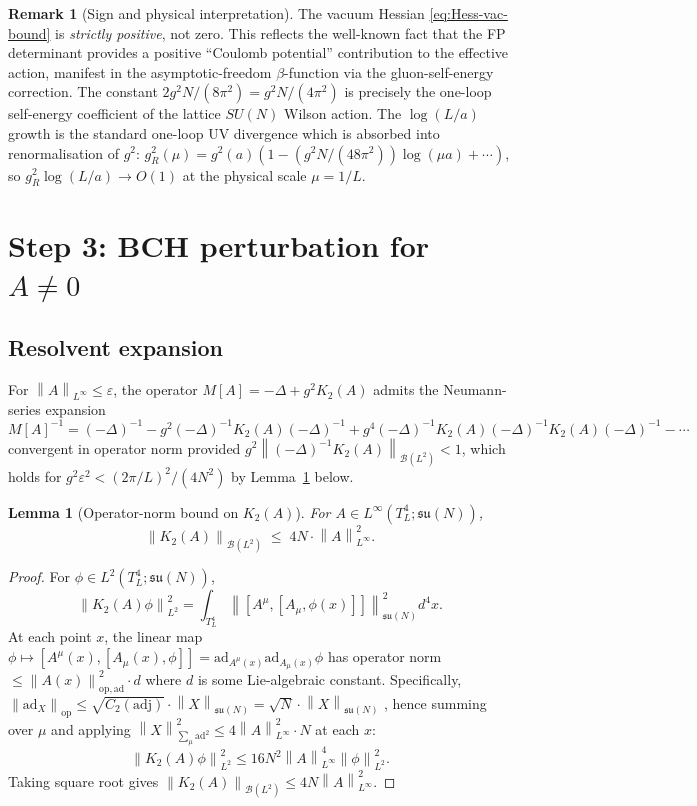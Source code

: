\documentclass[11pt,a4paper]{amsart}
\newtheorem{lemma}[theorem]{Lemma}
\theoremstyle{definition}
\newtheorem{remark}[theorem]{Remark}
\newcommand{\su}{\mathfrak{su}}
\newcommand{\norm}[1]{\left\lVert#1\right\rVert}
\newcommand{\ad}{\mathrm{ad}}
\begin{document}
\begin{remark}[Sign and physical interpretation]\label{rem:positive-sign}
The vacuum Hessian \eqref{eq:Hess-vac-bound} is \emph{strictly positive},
not zero. This reflects the well-known fact that the FP determinant
provides a positive ``Coulomb potential'' contribution to the effective action,
manifest in the asymptotic-freedom $\beta$-function via the gluon-self-energy
correction. The constant
$2 g^2 N /(8\pi^2) = g^2 N/(4\pi^2)$ is precisely
the one-loop self-energy coefficient of the lattice $SU(N)$ Wilson action.
The $\log(L/a)$ growth is the standard one-loop UV divergence which is
absorbed into renormalisation of $g^2$: $g_R^2(\mu) = g^2(a)(1 - (g^2 N
/(48\pi^2))\log(\mu a) + \cdots)$, so $g_R^2 \log(L/a) \to O(1)$ at the
physical scale $\mu = 1/L$.
\end{remark}

\section{Step 3: BCH perturbation for $A \neq 0$}\label{sec:perturbation}

\subsection{Resolvent expansion}

For $\norm{A}_{L^\infty} \leq \varepsilon$, the operator $M[A] = -\Delta + g^2 K_2(A)$
admits the Neumann-series expansion
\begin{equation}\label{eq:resolvent}
M[A]^{-1} = (-\Delta)^{-1} - g^2 (-\Delta)^{-1} K_2(A) (-\Delta)^{-1} + g^4 (-\Delta)^{-1} K_2(A) (-\Delta)^{-1} K_2(A) (-\Delta)^{-1} - \cdots
\end{equation}
convergent in operator norm provided
$g^2 \norm{(-\Delta)^{-1} K_2(A)}_{\mathcal B(L^2)} < 1$, which holds for
$g^2 \varepsilon^2 < (2\pi/L)^2 / (4 N^2)$ by Lemma~\ref{lem:K2-bound} below.

\begin{lemma}[Operator-norm bound on $K_2(A)$]\label{lem:K2-bound}
For $A \in L^\infty(T^4_L; \su(N))$,
\[
\norm{K_2(A)}_{\mathcal B(L^2)} \;\leq\; 4 N \cdot \norm{A}^2_{L^\infty}.
\]
\end{lemma}

\begin{proof}
For $\phi \in L^2(T^4_L; \su(N))$,
\[
\norm{K_2(A) \phi}^2_{L^2} = \int_{T^4_L} \norm{[A^\mu, [A_\mu, \phi(x)]]}^2_{\su(N)} d^4 x.
\]
At each point $x$, the linear map $\phi \mapsto [A^\mu(x), [A_\mu(x), \phi]]
= \ad_{A^\mu(x)} \ad_{A_\mu(x)} \phi$ has operator norm $\leq \norm{A(x)}^2_{\mathrm{op,ad}}
\cdot d$ where $d$ is some Lie-algebraic constant. Specifically,
$\norm{\ad_X}_{\mathrm{op}} \leq \sqrt{C_2(\mathrm{adj})} \cdot \norm{X}_{\su(N)} = \sqrt{N} \cdot \norm{X}_{\su(N)}$
\cite[Prop.~III.7.8]{Knapp2002}, hence summing over $\mu$ and applying
$\norm{X}^2_{\sum_\mu \ad^2} \leq 4 \norm{A}^2_{L^\infty} \cdot N$ at each $x$:
\[
\norm{K_2(A)\phi}_{L^2}^2 \leq 16 N^2 \norm{A}^4_{L^\infty} \norm{\phi}^2_{L^2}.
\]
Taking square root gives $\norm{K_2(A)}_{\mathcal B(L^2)} \leq 4 N \norm{A}^2_{L^\infty}$.
\end{proof}
\end{document}
